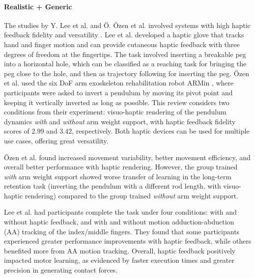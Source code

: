 \paragraph{Realistic + Generic} \label{sec:realisticgeneric}
The studies by Y. Lee et al. and Ö. Özen et al. involved systems with high haptic feedback fidelity and versatility \cite{LeeY2019, Oezen2022}. Lee et al. developed a haptic glove that tracks hand and finger motion and can provide cutaneous haptic feedback with three degrees of freedom at the fingertips. The task involved inserting a breakable peg into a horizontal hole, which can be classified as a reaching task for bringing the peg close to the hole, and then as trajectory following for inserting the peg. Özen et al. used the six DoF arm exoskeleton rehabilitation robot ARMin \cite{Just2018ExoskeletonObserver}, where participants were asked to invert a pendulum by moving its pivot point and keeping it vertically inverted as long as possible. This review considers two conditions from their experiment: visuo-haptic rendering of the pendulum dynamics \textit{with} and \textit{without} arm weight support, with haptic feedback fidelity scores of 2.99 and 3.42, respectively. 
Both haptic devices can be used for multiple use cases, offering great versatility.

Özen et al. found increased movement variability, better movement efficiency, and overall better performance with haptic rendering. However, the group trained \textit{with} arm weight support showed worse transfer of learning in the long-term retention task (inverting the pendulum with a different rod length, with visuo-haptic rendering) compared to the group trained \textit{without} arm weight support.

Lee et al. had participants complete the task under four conditions: with and without haptic feedback, and with and without motion adduction-abduction (AA) tracking of the index/middle fingers. They found that some participants experienced greater performance improvements with haptic feedback, while others benefited more from AA motion tracking. Overall, haptic feedback positively impacted motor learning, as evidenced by faster execution times and greater precision in generating contact forces.

